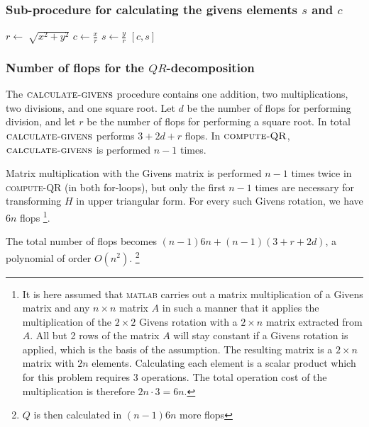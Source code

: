 \subsubsection*{Sub-procedure for calculating the givens elements $s$ and $c$}
\begin{algorithmic}
\State $r \gets \sqrt[]{x^2+y^2 }$ 
\State $c \gets \frac{x}{r} $
\State $s \gets \frac{y}{r} $
\State \Return $[c, s]$
\EndFunction
\end{algorithmic}

\subsubsection*{Number of flops for the $QR$-decomposition}
The $\textsc{calculate-givens}$ procedure contains one addition, two multiplications, two divisions, and one square root. 
Let $d$ be the number of flops for performing division, and let $r$ be the number of flops for performing a square root. 
In total $\textsc{calculate-givens}$ performs $3+2d+r$ flops. In $\textsc{compute-QR}$, $\textsc{calculate-givens}$ is performed $n-1$ times. 

Matrix multiplication with the Givens matrix is performed $n-1$ times twice in \textsc{compute-QR} (in both for-loops), but only the first $n-1$ times are necessary for transforming $H$ in upper triangular form. 
For every such Givens rotation, we have $6n$ flops \footnote{
It is here assumed that \textsc{matlab} carries out a matrix multiplication of a Givens matrix and any $n \times n$ matrix $A$ in such a manner that it applies the multiplication of the $2\times2$ Givens rotation with a $2\times n$ matrix extracted from $A$. 
All but 2 rows of the matrix $A$ will stay constant if a Givens rotation is applied, which is the basis of the assumption. 
The resulting matrix is a $2\times n$ matrix with $2n$ elements. 
Calculating each element is a scalar product which for this problem requires 3 operations. 
The total operation cost of the multiplication is therefore $2n\cdot 3=6n$. 
}. 

The total number of flops becomes $(n-1)6n+(n-1)(3+r+2d)$, a polynomial of order $O(n^2)$.
\footnote{$Q$ is then calculated in $(n-1)6n$ more flops}

